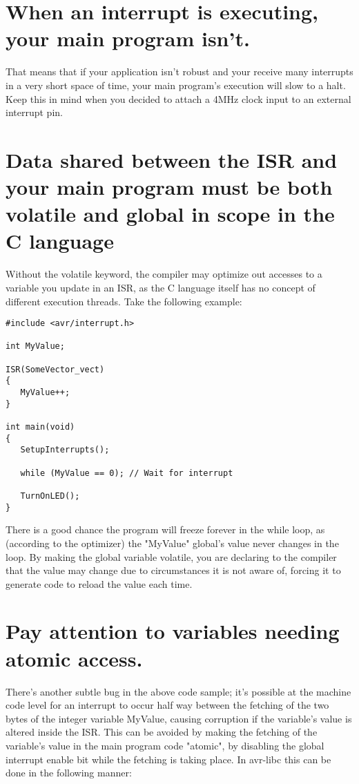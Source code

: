 \documentclass[a4paper,oneside]{book}
\begin{document}
\section{When an interrupt is executing, your main program isn't.}
That means that if your application isn't robust and your receive many interrupts in a very short space of time, your main program's execution will slow to a halt. Keep this in mind when you decided to attach a 4MHz clock input to an external interrupt pin.

\section{Data shared between the ISR and your main program must be both volatile and global in scope in the C language}
Without the volatile keyword, the compiler may optimize out accesses to a variable you update in an ISR, as the C language itself has no concept of different execution threads. Take the following example:

\begin{center}
\begin{lstlisting}
#include <avr/interrupt.h>

int MyValue;

ISR(SomeVector_vect)
{
   MyValue++;
}

int main(void)
{
   SetupInterrupts();

   while (MyValue == 0); // Wait for interrupt

   TurnOnLED();
}
\end{lstlisting}
\end{center}

There is a good chance the program will freeze forever in the while loop, as (according to the optimizer) the "MyValue" global's value never changes in the loop. By making the global variable volatile, you are declaring to the compiler that the value may change due to circumstances it is not aware of, forcing it to generate code to reload the value each time.

\section{Pay attention to variables needing atomic access.}
There's another subtle bug in the above code sample; it's possible at the machine code level for an interrupt to occur half way between the fetching of the two bytes of the integer variable MyValue, causing corruption if the variable's value is altered inside the ISR. This can be avoided by making the fetching of the variable's value in the main program code "atomic", by disabling the global interrupt enable bit while the fetching is taking place. In avr-libc this can be done in the following manner:
\end{document}
